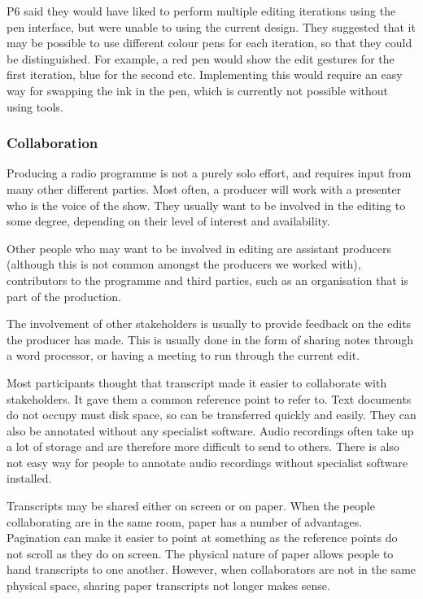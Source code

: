 P6 said they would have liked to perform multiple editing iterations using the pen interface, but were unable to using
the current design. They suggested that it may be possible to use different colour pens for each iteration, so that
they could be distinguished. For example, a red pen would show the edit gestures for the first iteration, blue for the
second etc. Implementing this would require an easy way for swapping the ink in the pen, which is currently not
possible without using tools.

\subsubsection{Collaboration}

Producing a radio programme is not a purely solo effort, and requires input from many other different parties. Most
often, a producer will work with a presenter who is the voice of the show. They usually want to be involved in the
editing to some degree, depending on their level of interest and availability.

Other people who may want to be involved in editing are assistant producers (although this is not common amongst the
producers we worked with), contributors to the programme and third parties, such as an organisation that is part of the
production.

The involvement of other stakeholders is usually to provide feedback on the edits the producer has made. This is
usually done in the form of sharing notes through a word processor, or having a meeting to run through the current
edit.

Most participants thought that transcript made it easier to collaborate with stakeholders. It gave them a common
reference point to refer to. Text documents do not occupy must disk space, so can be transferred quickly and easily.
They can also be annotated without any specialist software. Audio recordings often take up a lot of storage and are
therefore more difficult to send to others. There is also not easy way for people to annotate audio recordings without
specialist software installed.

Transcripts may be shared either on screen or on paper. When the people collaborating are in the same room, paper has a
number of advantages. Pagination can make it easier to point at something as the reference points do not scroll as they
do on screen. The physical nature of paper allows people to hand transcripts to one another. However, when
collaborators are not in the same physical space, sharing paper transcripts not longer makes sense.

